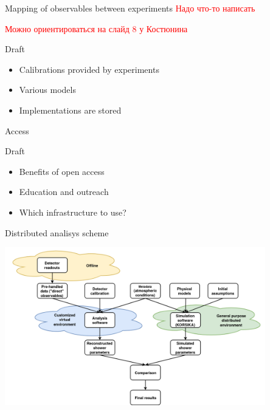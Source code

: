 \documentclass[18pt]{beamer}
\begin{document}
\begin{frame}{Mapping of observables between experiments}
\textcolor{red}{Надо что-то написать}

\textcolor{red}{Можно ориентироваться на слайд 8 у Костюнина}

\begin{block}{Draft}
  \begin{itemize}
    \item Calibrations provided by experiments
    \item Various models
    \item Implementations are stored
  \end{itemize}
\end{block}
\end{frame}

\begin{frame}{Access}
\begin{block}{Draft}
  \begin{itemize}
    \item Benefits of open access
    \item Education and outreach
    \item Which infrastructure to use?
  \end{itemize}
\end{block}
\end{frame}

\begin{frame}{Distributed analisys scheme}
\begin{center}
\includegraphics[width=0.85\textwidth]{pics/KCDC_workflow_f1.png}
\end{center}
\end{frame}
\end{document}
